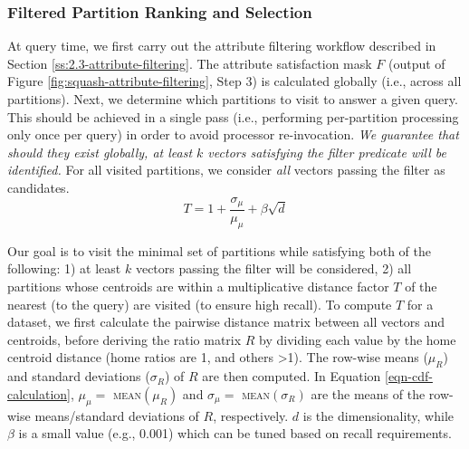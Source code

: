 \subsubsection{Filtered Partition Ranking and Selection}
At query time, we first carry out the attribute filtering workflow described in Section \ref{ss:2.3-attribute-filtering}. The attribute satisfaction mask $F$ (output of Figure \ref{fig:squash-attribute-filtering}, Step 3) is calculated globally (i.e., across all partitions).
Next, we determine which partitions to visit to answer a given query. 
This should be achieved in a single pass (i.e., performing per-partition processing only once per query) in order to avoid processor re-invocation.
\textit{We guarantee that should they exist globally, at least $k$ vectors satisfying the filter predicate will be identified.} For all visited partitions, we consider \textit{all} vectors passing the filter as candidates. %
\begin{equation}
    T = 1 + \frac{\sigma_{\mu}}{\mu_{\mu}} + \beta \sqrt{d}
    \label{eqn-cdf-calculation}
\end{equation}

Our goal is to visit the minimal set of partitions while satisfying both of the following: 1) at least $k$ vectors passing the filter will be considered, 2) all partitions whose centroids are within a multiplicative distance factor $T$ of the nearest (to the query) are visited (to ensure high recall).
To compute $T$ for a dataset, we first calculate the pairwise distance matrix between all vectors and centroids, before deriving the ratio matrix $R$ by dividing each value by the home centroid distance (home ratios are 1, and others >1). 
The row-wise means ($\mu_R$) and standard deviations ($\sigma_R$) of $R$ are then computed.
In Equation \ref{eqn-cdf-calculation}, $\mu_{\mu} = $ \textsc{mean}$ (\mu_{R}) $ and $\sigma_{\mu} = $ \textsc{mean}$ (\sigma_{R}) $ are the means of the row-wise means/standard deviations of $R$, respectively. $d$ is the dimensionality, while $\beta$ is a small value (e.g., 0.001) which can be tuned based on recall requirements. 

